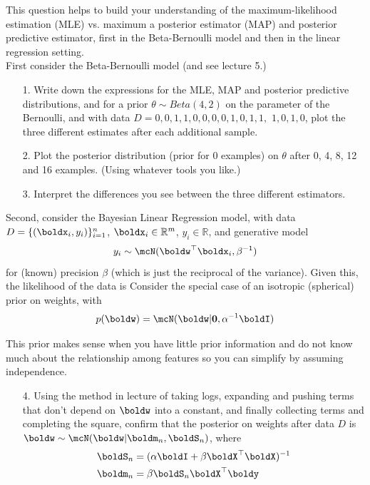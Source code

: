 \documentclass[submit]{harvardml}
\begin{document}
\begin{problem}

  This question helps to build your understanding of the
  maximum-likelihood estimation (MLE) vs. maximum a posterior estimator
  (MAP) and posterior predictive estimator, first in the
  Beta-Bernoulli model and then in the linear regression setting.\\

First consider the Beta-Bernoulli model (and see lecture 5.) 
%
\begin{enumerate}
\item[1.] Write down the expressions for the MLE, MAP and posterior predictive
distributions, and for
a prior $\theta\sim Beta(4,2)$ on the
parameter of the Bernoulli,
and  with data $D= 0, 0, 1, 1, 0, 0, 0, 0, 1, 0, 1, 1,$ 
$1, 0, 1, 0$, plot 
the three different
estimates after each additional
sample.
%
\item[2.] Plot the posterior distribution (prior for 0 examples) on $\theta$ after 0, 4, 8, 12 and 16
examples. (Using whatever tools you like.)
%
\item[3.] Interpret the differences you see between the three different
estimators.
%
%
\end{enumerate}

Second, consider the Bayesian Linear Regression model, with
data $D=\{(\boldx_i,y_i)\}_{i=1}^n$, $\boldx_i\in\mathbb{R}^m$,
 $y_i\in\mathbb{R}$, and generative model 
%
$$
y_i\sim\mcN(\boldw^\top\boldx_i,\beta^{-1})
$$
for (known) precision $\beta$ (which is just the reciprocal
of the variance). Given this, the likelihood of the
data is Consider the special case of 
an isotropic (spherical) prior on weights, with
%
$$
p(\boldw)=\mcN(\boldw|\bold0,\alpha^{-1}\boldI)
$$

This prior makes sense when you have little prior information and do not know much about the relationship among features so you can simplify by assuming independence.

\begin{enumerate}

\item[4.] Using the method in lecture of taking logs, expanding and pushing terms
that don't depend on $\boldw$ into a constant, and finally collecting
terms and completing the square, confirm that the posterior on
weights after data $D$ is $\boldw\sim\mcN(\boldw|\boldm_n,\boldS_n)$,
where
%
\begin{align*}
\boldS_n&=(\alpha\boldI+\beta\boldX^\top\boldX)^{-1}\\
\boldm_n&=\beta\boldS_n\boldX^\top\boldy
\end{align*}
\end{enumerate}
\end{problem}
\end{document}
